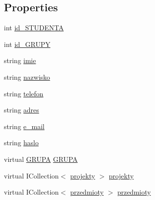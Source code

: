 \subsection*{Properties}
\begin{DoxyCompactItemize}
\item 
int \hyperlink{class_dziennik_ocen_1_1_s_t_u_d_e_n_t_a008c36e83a6fb6137a67a2322fb97faf}{id\+\_\+\+S\+T\+U\+D\+E\+N\+TA}
\item 
int \hyperlink{class_dziennik_ocen_1_1_s_t_u_d_e_n_t_acbdb5ab72a8be031fddeefc607699e2a}{id\+\_\+\+G\+R\+U\+PY}
\item 
string \hyperlink{class_dziennik_ocen_1_1_s_t_u_d_e_n_t_a83f8649ffd2396f095507c0ed9ad39ab}{imie}
\item 
string \hyperlink{class_dziennik_ocen_1_1_s_t_u_d_e_n_t_a1dfdbf0b27df20078ebdb69e3554cb6a}{nazwisko}
\item 
string \hyperlink{class_dziennik_ocen_1_1_s_t_u_d_e_n_t_ac1de4fe0b98bfb555e0fadbe1d146492}{telefon}
\item 
string \hyperlink{class_dziennik_ocen_1_1_s_t_u_d_e_n_t_adf4fa93b99445ccc0db7bd523a31bf94}{adres}
\item 
string \hyperlink{class_dziennik_ocen_1_1_s_t_u_d_e_n_t_a8c1def3c2bd8c74a30b751e3f333922f}{e\+\_\+mail}
\item 
string \hyperlink{class_dziennik_ocen_1_1_s_t_u_d_e_n_t_a315f275f66257814af0b92407350d2a7}{haslo}
\item 
virtual \hyperlink{class_dziennik_ocen_1_1_g_r_u_p_a}{G\+R\+U\+PA} \hyperlink{class_dziennik_ocen_1_1_s_t_u_d_e_n_t_aeea261f68812b6290f4a84986d5fa643}{G\+R\+U\+PA}
\item 
virtual I\+Collection$<$ \hyperlink{class_dziennik_ocen_1_1projekty}{projekty} $>$ \hyperlink{class_dziennik_ocen_1_1_s_t_u_d_e_n_t_a63a04deca4b2058bf9822f707f0b7e03}{projekty}
\item 
virtual I\+Collection$<$ \hyperlink{class_dziennik_ocen_1_1przedmioty}{przedmioty} $>$ \hyperlink{class_dziennik_ocen_1_1_s_t_u_d_e_n_t_a090aaef3f9d6a0d20e319d773b2a4cbb}{przedmioty}
\end{DoxyCompactItemize}



